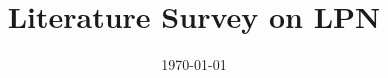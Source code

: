 \documentclass[11pt]{article}
\begin{document}
\author{}



\title{Literature Survey on LPN}

\date{\today}

\maketitle

\pagestyle{empty}
\thispagestyle{empty}

%


\newpage
\setcounter{page}{1}
\pagestyle{plain}


\newpage


\newpage

	
\newpage



\end{document}
